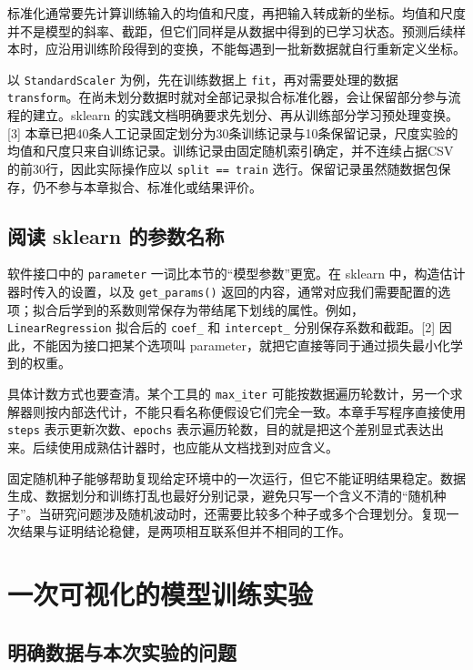 标准化通常要先计算训练输入的均值和尺度，再把输入转成新的坐标。均值和尺度并不是模型的斜率、截距，但它们同样是从数据中得到的已学习状态。预测后续样本时，应沿用训练阶段得到的变换，不能每遇到一批新数据就自行重新定义坐标。

以 \texttt{StandardScaler} 为例，先在训练数据上 \texttt{fit}，再对需要处理的数据 \texttt{transform}。在尚未划分数据时就对全部记录拟合标准化器，会让保留部分参与流程的建立。sklearn 的实践文档明确要求先划分、再从训练部分学习预处理变换。{[}3{]} 本章已把40条人工记录固定划分为30条训练记录与10条保留记录，尺度实验的均值和尺度只来自训练记录。训练记录由固定随机索引确定，并不连续占据CSV的前30行，因此实际操作应以 \texttt{split\ ==\ \textquotesingle{}train\textquotesingle{}} 选行。保留记录虽然随数据包保存，仍不参与本章拟合、标准化或结果评价。

\subsection{阅读 sklearn 的参数名称}

软件接口中的 \texttt{parameter} 一词比本节的``模型参数''更宽。在 sklearn 中，构造估计器时传入的设置，以及 \texttt{get\_params()} 返回的内容，通常对应我们需要配置的选项；拟合后学到的系数则常保存为带结尾下划线的属性。例如，\texttt{LinearRegression} 拟合后的 \texttt{coef\_} 和 \texttt{intercept\_} 分别保存系数和截距。{[}2{]} 因此，不能因为接口把某个选项叫 parameter，就把它直接等同于通过损失最小化学到的权重。

具体计数方式也要查清。某个工具的 \texttt{max\_iter} 可能按数据遍历轮数计，另一个求解器则按内部迭代计，不能只看名称便假设它们完全一致。本章手写程序直接使用 \texttt{steps} 表示更新次数、\texttt{epochs} 表示遍历轮数，目的就是把这个差别显式表达出来。后续使用成熟估计器时，也应能从文档找到对应含义。

固定随机种子能够帮助复现给定环境中的一次运行，但它不能证明结果稳定。数据生成、数据划分和训练打乱也最好分别记录，避免只写一个含义不清的``随机种子''。当研究问题涉及随机波动时，还需要比较多个种子或多个合理划分。复现一次结果与证明结论稳健，是两项相互联系但并不相同的工作。

\section{一次可视化的模型训练实验}

\subsection{明确数据与本次实验的问题}

